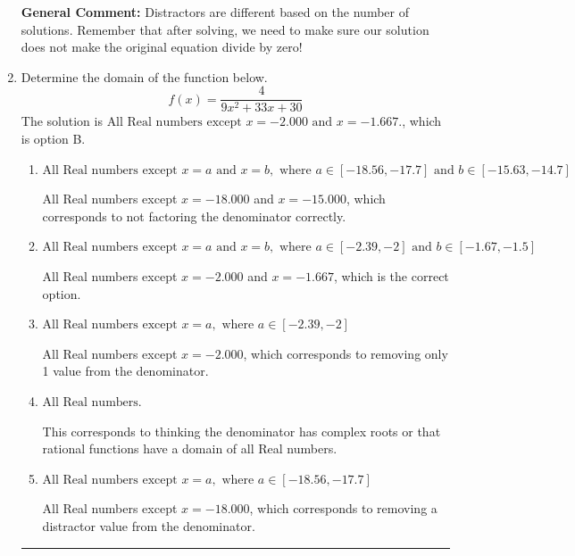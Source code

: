 \documentclass{extbook}[14pt]
\newcommand{\litem}[1]{\item #1

\rule{\textwidth}{0.4pt}}
\begin{document}
\begin{enumerate}
{\begin{enumerate}[label=\Alph*.]
\end{enumerate}

\textbf{General Comment:} Distractors are different based on the number of solutions. Remember that after solving, we need to make sure our solution does not make the original equation divide by zero!
}
\litem{
Determine the domain of the function below.
\[ f(x) = \frac{4}{9x^{2} +33 x + 30} \]The solution is \( \text{All Real numbers except } x = -2.000 \text{ and } x = -1.667. \), which is option B.\begin{enumerate}[label=\Alph*.]
\item \( \text{All Real numbers except } x = a \text{ and } x = b, \text{ where } a \in [-18.56, -17.7] \text{ and } b \in [-15.63, -14.7] \)

All Real numbers except $x = -18.000$ and $x = -15.000$, which corresponds to not factoring the denominator correctly.
\item \( \text{All Real numbers except } x = a \text{ and } x = b, \text{ where } a \in [-2.39, -2] \text{ and } b \in [-1.67, -1.5] \)

All Real numbers except $x = -2.000$ and $x = -1.667$, which is the correct option.
\item \( \text{All Real numbers except } x = a, \text{ where } a \in [-2.39, -2] \)

All Real numbers except $x = -2.000$, which corresponds to removing only 1 value from the denominator.
\item \( \text{All Real numbers.} \)

This corresponds to thinking the denominator has complex roots or that rational functions have a domain of all Real numbers.
\item \( \text{All Real numbers except } x = a, \text{ where } a \in [-18.56, -17.7] \)

All Real numbers except $x = -18.000$, which corresponds to removing a distractor value from the denominator.
\end{enumerate}

}
\end{enumerate}
\end{document}
